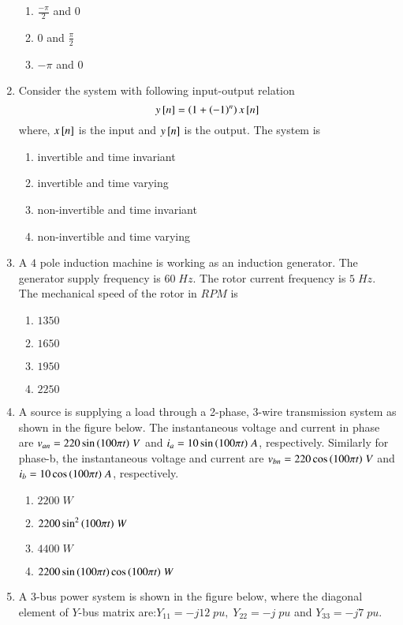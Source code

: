 \documentclass[journal,12pt,onecolumn]{IEEEtran}
\theoremstyle{remark}
\begin{document}
\begin{enumerate}
\begin{enumerate}
    \item $\frac{-\pi}{2}$ and $0$
    \item $0$ and $\frac{\pi}{2}$
    \item $-\pi$ and $0$
\end{enumerate}
\item Consider the system with following input-output relation $$y{}\left[n\right]=\left(1+\left(-1\right)^n\right)x{}\left[n\right]$$ where, $x{}\left[n\right]$ is the input and $y{}\left[n\right]$ is the output. The system is
\begin{enumerate}
    \item invertible and time invariant 
    \item invertible and time varying
    \item non-invertible and time invariant
    \item non-invertible and time varying
\end{enumerate}
\item A $4$ pole induction machine is working as an induction generator. The generator supply frequency is $60\;Hz$. The rotor current frequency is $5\;Hz$. The mechanical speed of the rotor in $RPM$ is
\begin{enumerate}
    \item $1350$
    \item $1650$
    \item $1950$
    \item $2250$
\end{enumerate}
\item A source is supplying a load through a 2-phase, 3-wire transmission system as shown in the figure below. The instantaneous voltage and current in phase are $v_{an}=220\sin{\ensuremath{\left(100\pi t\right)}}\;V$ and $i_a=10\sin{\ensuremath{\left(100\pi t\right)}}\;A$, respectively. Similarly for phase-b, the instantaneous voltage and current are $v_{bn}=220\cos{\ensuremath{\left(100\pi t\right)}}\;V$ and $i_b=10\cos{\ensuremath{\left(100\pi t\right)}}\;A$, respectively.

\begin{enumerate}
    \item $2200\;W$
    \item $2200\sin^2{\left(100\pi t\right)}\;W$
    \item $4400\;W$
    \item $2200\sin{\ensuremath{\left(100\pi t\right)}}\cos{\ensuremath{\left(100\pi t\right)}}\;W$
\end{enumerate}
\item A 3-bus power system is shown in the figure below, where the diagonal element of $Y$-bus matrix are:$Y_{11}=-j12\;pu,\;Y_{22}=-j\;pu$ and $Y_{33}=-j7\;pu$.\\

\end{enumerate}
\end{document}
